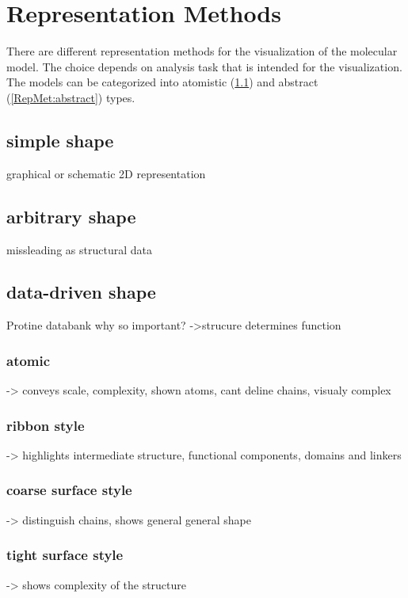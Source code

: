 \documentclass{egpubl}
\begin{document}
\section{Representation Methods}
\label{RepMet:intro}
There are different representation methods for the visualization of the molecular model. The choice depends on analysis task that is intended for the visualization. The models can be categorized into atomistic (\ref{RepMet:atomistic}) and abstract (\ref{RepMet:abstract}) types.

\subsection{simple shape} %
\label{RepMet:atomistic}
 graphical or schematic 2D representation
 
\subsection{arbitrary shape}
 missleading as structural data
 
 
\subsection{data-driven shape}
 Protine databank
 why so important? ->strucure determines function
\subsubsection{atomic}
-> conveys scale, complexity, shown atoms, cant deline chains, visualy complex

\subsubsection{ribbon style}
-> highlights intermediate structure, functional components, domains and linkers


\subsubsection{coarse surface style}
-> distinguish chains, shows general general shape


\subsubsection{tight surface style}
-> shows complexity of the structure
\end{document}
